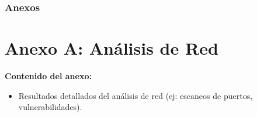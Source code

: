 \subsection{Anexos}
\appendix  %

\chapter{Anexo A: Análisis de Red}
\label{annex:a}

\textbf{Contenido del anexo:}
\begin{itemize}
	\item Resultados detallados del análisis de red (ej: escaneos de puertos, vulnerabilidades).
\end{itemize}


  